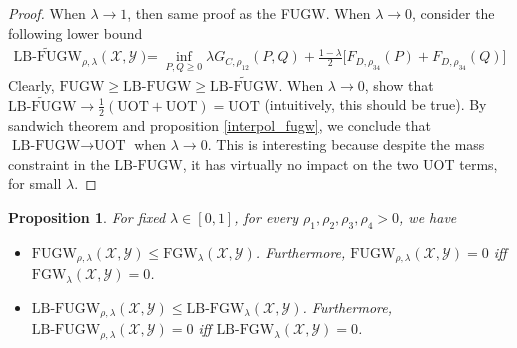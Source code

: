\documentclass{article}
\newtheorem{proposition}[theorem]{Proposition}
\theoremstyle{remark}
\begin{document}
\begin{proof}
When $\lambda \to 1$, then same proof as the FUGW. When $\lambda \to 0$, consider the following lower bound
\begin{equation*}
    \begin{split}
      \widetilde{\text{LB-FUGW}}_{\rho, \lambda}(\mathcal X, \mathcal Y) &= \inf_{P,Q \geq 0} \lambda G_{C,\rho_{12}}(P,Q) + \frac{1 - \lambda}{2} \big[ F_{D,\rho_{34}}(P) + F_{D,\rho_{34}}(Q) \big]
    \end{split}
\end{equation*}
Clearly, $\text{FUGW} \geq \text{LB-FUGW} \geq \widetilde{\text{LB-FUGW}}$. When $\lambda \to 0$, show that $\widetilde{\text{LB-FUGW}} \to \frac{1}{2}(\text{UOT}+ \text{UOT}) = \text{UOT}$ (intuitively, this should be true). By sandwich theorem and proposition \ref{interpol_fugw}, we conclude that $\text{LB-FUGW} \to \text{UOT}$ when $\lambda \to 0$.
This is interesting because despite the mass constraint in the $\text{LB-FUGW}$, it has virtually no impact on the two UOT terms, for small $\lambda$.
\end{proof}
\begin{proposition}
    For fixed $\lambda \in [0,1]$, for every $\rho_1, \rho_2, \rho_3, \rho_4 > 0$, we have
    \begin{itemize}
        \item $\text{FUGW}_{\rho, \lambda}(\mathcal X, \mathcal Y) \leq \text{FGW}_{\lambda}(\mathcal X, \mathcal Y)$. Furthermore, $\text{FUGW}_{\rho, \lambda}(\mathcal X, \mathcal Y) = 0$ iff $\text{FGW}_{\lambda}(\mathcal X, \mathcal Y) = 0$.

        \item $\text{LB-FUGW}_{\rho, \lambda}(\mathcal X, \mathcal Y) \leq \text{LB-FGW}_{\lambda}(\mathcal X, \mathcal Y)$. Furthermore, $\text{LB-FUGW}_{\rho, \lambda}(\mathcal X, \mathcal Y) = 0$ iff $\text{LB-FGW}_{\lambda}(\mathcal X, \mathcal Y) = 0$.
    \end{itemize}
    
\end{proposition}
\end{document}
